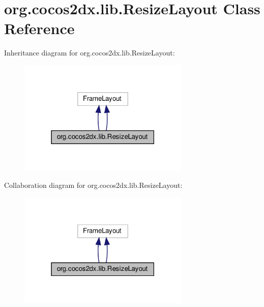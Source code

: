 \hypertarget{classorg_1_1cocos2dx_1_1lib_1_1ResizeLayout}{}\section{org.\+cocos2dx.\+lib.\+Resize\+Layout Class Reference}
\label{classorg_1_1cocos2dx_1_1lib_1_1ResizeLayout}


Inheritance diagram for org.\+cocos2dx.\+lib.\+Resize\+Layout\+:
\nopagebreak
\begin{figure}[H]
\begin{center}
\leavevmode
\includegraphics[width=231pt]{classorg_1_1cocos2dx_1_1lib_1_1ResizeLayout__inherit__graph}
\end{center}
\end{figure}


Collaboration diagram for org.\+cocos2dx.\+lib.\+Resize\+Layout\+:
\nopagebreak
\begin{figure}[H]
\begin{center}
\leavevmode
\includegraphics[width=231pt]{classorg_1_1cocos2dx_1_1lib_1_1ResizeLayout__coll__graph}
\end{center}
\end{figure}
